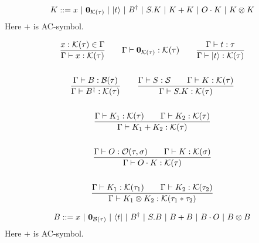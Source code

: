 \begin{definition}
\begin{definition}
  \begin{align*}
    K ::= x\ |\ \mathbf{0}_{\mathcal{K}(\tau)}\ |\ |t\rangle\ |\ B^\dagger\ |\ S.K\ |\ K + K\ |\ O \cdot K\ |\ K \otimes K
  \end{align*}
  Here $+$ is AC-symbol.
\end{definition}


\begin{definition}
  \begin{gather*}
    \frac{x : \mathcal{K}(\tau) \in \Gamma}{\Gamma \vdash x : \mathcal{K}(\tau)}
    \qquad
    \Gamma \vdash \mathbf{0}_{\mathcal{K}(\tau)} : \mathcal{K}(\tau)
    \qquad
    \frac{\Gamma \vdash t : \tau}{\Gamma \vdash |t\rangle : \mathcal{K}(\tau)} \\
    \\
    \frac{\Gamma \vdash B : \mathcal{B}(\tau)}{\Gamma \vdash B^\dagger : \mathcal{K}(\tau)}
    \qquad
    \frac{\Gamma \vdash S : \mathcal{S} \qquad \Gamma \vdash K : \mathcal{K}(\tau)}{\Gamma \vdash S.K : \mathcal{K}(\tau)} \\
    \\
    \frac{\Gamma \vdash K_1 : \mathcal{K}(\tau) \qquad \Gamma \vdash K_2 : \mathcal{K}(\tau)}{\Gamma \vdash K_1 + K_2 : \mathcal{K}(\tau)} \\
    \\
    \frac{\Gamma \vdash O : \mathcal{O}(\tau, \sigma) \qquad \Gamma \vdash K : \mathcal{K}(\sigma)}{\Gamma \vdash O \cdot K : \mathcal{K}(\tau)} \\
    \\
    \frac{\Gamma \vdash K_1 : \mathcal{K}(\tau_1) \qquad \Gamma \vdash K_2 : \mathcal{K}(\tau_2)}{\Gamma \vdash K_1 \otimes K_2 : \mathcal{K}(\tau_1 * \tau_2)}
  \end{gather*}
\end{definition}


\begin{definition}
  \begin{align*}
    B ::= x\ |\ \mathbf{0}_{\mathcal{B}(\tau)}\ |\ \langle t|\ |\ B^\dagger\ |\ S.B\ |\ B + B\ |\ B \cdot O\ |\ B \otimes B
  \end{align*}
  Here $+$ is AC-symbol.
\end{definition}



\end{definition}
